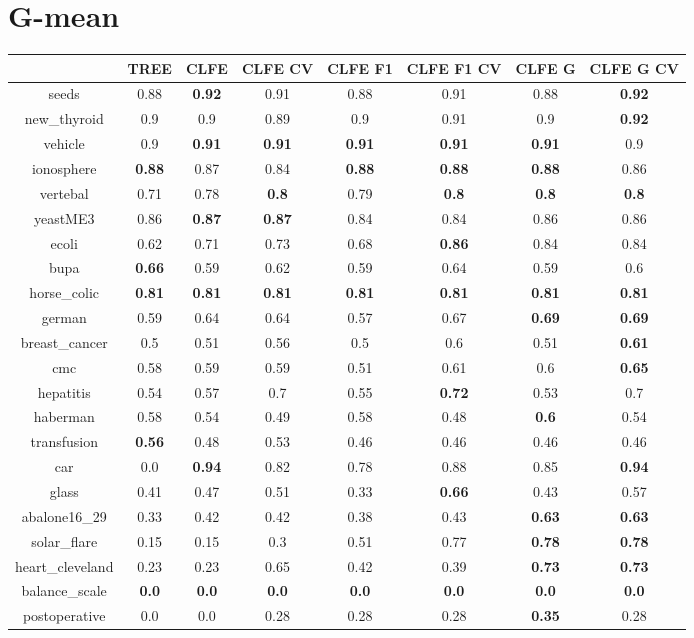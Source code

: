 \documentclass{article}%
\begin{document}
%
\section*{G{-}mean}%
\begin{tabular}{c|ccccccc}%
\hline%
&TREE&CLFE&CLFE CV&CLFE F1&CLFE F1 CV&CLFE G&CLFE G CV\\%
\hline%
seeds&0.88&\textbf{0.92}&0.91&0.88&0.91&0.88&\textbf{0.92}\\%
new\_thyroid&0.9&0.9&0.89&0.9&0.91&0.9&\textbf{0.92}\\%
vehicle&0.9&\textbf{0.91}&\textbf{0.91}&\textbf{0.91}&\textbf{0.91}&\textbf{0.91}&0.9\\%
ionosphere&\textbf{0.88}&0.87&0.84&\textbf{0.88}&\textbf{0.88}&\textbf{0.88}&0.86\\%
vertebal&0.71&0.78&\textbf{0.8}&0.79&\textbf{0.8}&\textbf{0.8}&\textbf{0.8}\\%
yeastME3&0.86&\textbf{0.87}&\textbf{0.87}&0.84&0.84&0.86&0.86\\%
ecoli&0.62&0.71&0.73&0.68&\textbf{0.86}&0.84&0.84\\%
bupa&\textbf{0.66}&0.59&0.62&0.59&0.64&0.59&0.6\\%
horse\_colic&\textbf{0.81}&\textbf{0.81}&\textbf{0.81}&\textbf{0.81}&\textbf{0.81}&\textbf{0.81}&\textbf{0.81}\\%
german&0.59&0.64&0.64&0.57&0.67&\textbf{0.69}&\textbf{0.69}\\%
breast\_cancer&0.5&0.51&0.56&0.5&0.6&0.51&\textbf{0.61}\\%
cmc&0.58&0.59&0.59&0.51&0.61&0.6&\textbf{0.65}\\%
hepatitis&0.54&0.57&0.7&0.55&\textbf{0.72}&0.53&0.7\\%
haberman&0.58&0.54&0.49&0.58&0.48&\textbf{0.6}&0.54\\%
transfusion&\textbf{0.56}&0.48&0.53&0.46&0.46&0.46&0.46\\%
car&0.0&\textbf{0.94}&0.82&0.78&0.88&0.85&\textbf{0.94}\\%
glass&0.41&0.47&0.51&0.33&\textbf{0.66}&0.43&0.57\\%
abalone16\_29&0.33&0.42&0.42&0.38&0.43&\textbf{0.63}&\textbf{0.63}\\%
solar\_flare&0.15&0.15&0.3&0.51&0.77&\textbf{0.78}&\textbf{0.78}\\%
heart\_cleveland&0.23&0.23&0.65&0.42&0.39&\textbf{0.73}&\textbf{0.73}\\%
balance\_scale&\textbf{0.0}&\textbf{0.0}&\textbf{0.0}&\textbf{0.0}&\textbf{0.0}&\textbf{0.0}&\textbf{0.0}\\%
postoperative&0.0&0.0&0.28&0.28&0.28&\textbf{0.35}&0.28\\%
\end{tabular}

%
\end{document}

